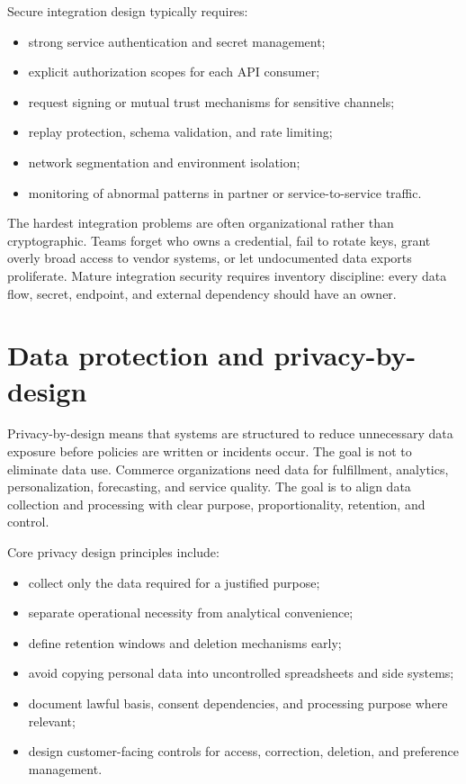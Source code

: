 Secure integration design typically requires:
\begin{itemize}
  \item strong service authentication and secret management;
  \item explicit authorization scopes for each API consumer;
  \item request signing or mutual trust mechanisms for sensitive channels;
  \item replay protection, schema validation, and rate limiting;
  \item network segmentation and environment isolation;
  \item monitoring of abnormal patterns in partner or service-to-service traffic.
\end{itemize}

The hardest integration problems are often organizational rather than cryptographic. Teams forget who owns a credential, fail to rotate keys, grant overly broad access to vendor systems, or let undocumented data exports proliferate. Mature integration security requires inventory discipline: every data flow, secret, endpoint, and external dependency should have an owner.

\section{Data protection and privacy-by-design}
Privacy-by-design means that systems are structured to reduce unnecessary data exposure before policies are written or incidents occur. The goal is not to eliminate data use. Commerce organizations need data for fulfillment, analytics, personalization, forecasting, and service quality. The goal is to align data collection and processing with clear purpose, proportionality, retention, and control.

Core privacy design principles include:
\begin{itemize}
  \item collect only the data required for a justified purpose;
  \item separate operational necessity from analytical convenience;
  \item define retention windows and deletion mechanisms early;
  \item avoid copying personal data into uncontrolled spreadsheets and side systems;
  \item document lawful basis, consent dependencies, and processing purpose where relevant;
  \item design customer-facing controls for access, correction, deletion, and preference management.
\end{itemize}

